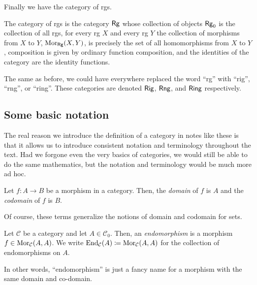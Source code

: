Finally we have the category of rgs.
\begin{exm}
The category of rgs is the category $\Rg$\index[notation]{$\Rg$} whose collection of objects $\mathsf{Rg} _0$ is the collection of all rgs, for every rg $X$ and every rg $Y$ the collection of morphisms from $X$ to $Y$, $\operatorname{Mor} _{\mathsf{Rg}}(X,Y)$, is precisely the set of all homomorphisms from $X$ to $Y$, composition is given by ordinary function composition, and the identities of the category are the identity functions.
\begin{rmk}
The same as before, we could have everywhere replaced the word ``rg'' with ``rig'', ``rng'', or ``ring''.  These categories are denoted $\Rig$\index[notation]{$\Rig$}, $\Rng$\index[notation]{$\Rng$}, and $\Ring$\index[notation]{$\Ring$} respectively.
\end{rmk}
\end{exm}

\subsection{Some basic notation}

The real reason we introduce the definition of a category in notes like these is that it allows us to introduce consistent notation and terminology throughout the text.  Had we forgone even the very basics of categories, we would still be able to do the same mathematics, but the notation and terminology would be much more ad hoc.
\begin{dfn}
Let $f:A\rightarrow B$ be a morphism in a category.  Then, the \emph{domain} of $f$ is $A$ and the \emph{codomain} of $f$ is $B$.
\begin{rmk}
Of course, these terms generalize the notions of domain and codomain for sets.
\end{rmk}
\end{dfn}
\begin{dfn}[Endomorphisms]
Let $\mathcal{C}$ be a category and let $A\in \mathcal{C}_0$.  Then, an \emph{endomorphism} is a morphism $f\in \operatorname{Mor} _{\mathcal{C}}(A,A)$.  We write $\operatorname{End} _{\mathcal{C}}(A)\coloneqq \operatorname{Mor} _{\mathcal{C}}(A,A)$ for the collection of endomorphisms on $A$.
\end{dfn}
In other words, ``endomorphism'' is just a fancy name for a morphism with the same domain and co-domain.

